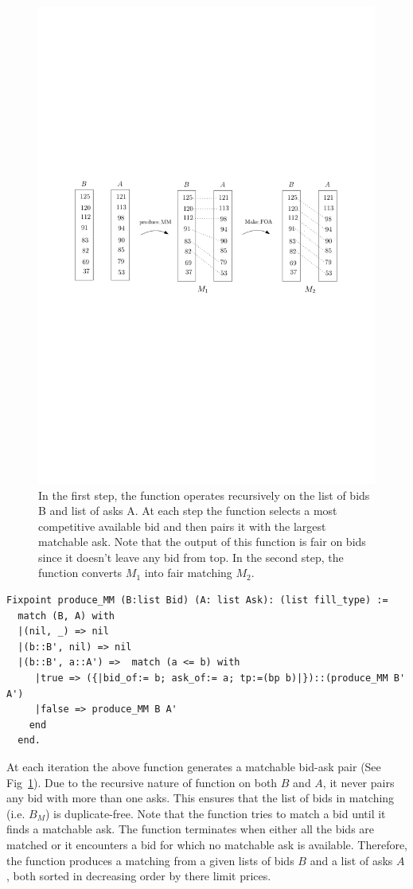 \documentclass[a4paper,UKenglish,cleveref, autoref]{lipics-v2019}
\begin{document}
\begin{figure}[h!]
\centering
\includegraphics[width=.8\textwidth]{MM.pdf}
\caption{In the first step, the function  operates recursively on the list of bids B and list of asks A. At each step the function  selects a most competitive available bid and then pairs it with the largest matchable ask. Note that the output of this function is fair on bids since it doesn't leave any bid from top. In the second step, the function  converts  $M_1$ into fair matching $M_2$. }
\label{fig:mm}
\end{figure}

\begin{verbatim}
Fixpoint produce_MM (B:list Bid) (A: list Ask): (list fill_type) :=
  match (B, A) with
  |(nil, _) => nil
  |(b::B', nil) => nil              
  |(b::B', a::A') =>  match (a <= b) with
     |true => ({|bid_of:= b; ask_of:= a; tp:=(bp b)|})::(produce_MM B' A')
     |false => produce_MM B A'
    end
  end. 
\end{verbatim}

At each iteration the above function generates a matchable bid-ask pair (See Fig~\ref{fig:mm}). Due to the recursive nature of  function   on both $B$ and $A$, it never pairs any bid with more than one asks. This ensures that the list of bids in matching (i.e. $B_M$) is duplicate-free. Note that the function  tries to match a bid until it finds a matchable ask. The function terminates when either all the bids are matched or it encounters a bid for which no matchable ask is available.  Therefore, the function  produces a matching from a given lists of bids $B$ and a list of asks $A$, both sorted in decreasing order by there limit prices.  
\end{document}

